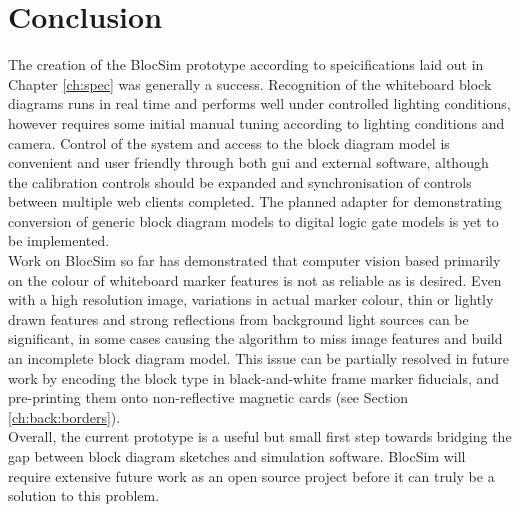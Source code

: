 \chapter{Conclusion}

The creation of the BlocSim prototype according to speicifications laid out in Chapter \ref{ch:spec} was generally a success. Recognition of the whiteboard block diagrams runs in real time and performs well under controlled lighting conditions, however requires some initial manual tuning according to lighting conditions and camera. Control of the system and access to the block diagram model is convenient and user friendly through both \gls{gui} and external software, although the calibration controls should be expanded and synchronisation of controls between multiple web clients completed. The planned adapter for demonstrating conversion of generic block diagram models to digital logic gate models is yet to be implemented.
\\

Work on BlocSim so far has demonstrated that computer vision based primarily on the colour of whiteboard marker features is not as reliable as is desired. Even with a high resolution image, variations in actual marker colour, thin or lightly drawn features and strong reflections from background light sources can be significant, in some cases causing the algorithm to miss image features and build an incomplete block diagram model. This issue can be partially resolved in future work by encoding the block type in black-and-white frame marker fiducials, and pre-printing them onto non-reflective magnetic cards (see Section \ref{ch:back:borders}).
\\

Overall, the current prototype is a useful but small first step towards bridging the gap between block diagram sketches and simulation software. BlocSim will require extensive future work as an open source project before it can truly be a solution to this problem.


\begin{comment}

\end{comment}

